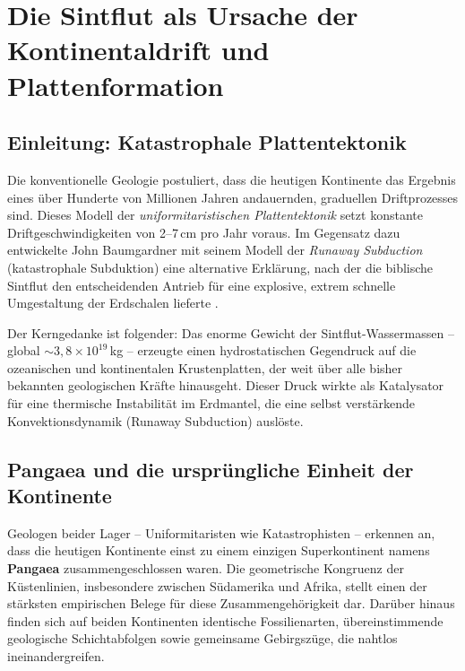 ﻿\documentclass[12pt,a4paper]{report}
\begin{document}
\chapter{Die Sintflut als Ursache der Kontinentaldrift und Plattenformation}
\label{sec:plattentektonik}

\section{Einleitung: Katastrophale Plattentektonik}

Die konventionelle Geologie postuliert, dass die heutigen Kontinente das Ergebnis eines über Hunderte von Millionen Jahren andauernden, graduellen Driftprozesses sind. Dieses Modell der \textit{uniformitaristischen Plattentektonik} setzt konstante Driftgeschwindigkeiten von 2--7\,cm pro Jahr voraus. Im Gegensatz dazu entwickelte John Baumgardner mit seinem Modell der \textit{Runaway Subduction} (katastrophale Subduktion) eine alternative Erklärung, nach der die biblische Sintflut den entscheidenden Antrieb für eine explosive, extrem schnelle Umgestaltung der Erdschalen lieferte \cite{baumgardner1994}.

Der Kerngedanke ist folgender: Das enorme Gewicht der Sintflut-Wassermassen -- global $\sim 3{,}8 \times 10^{19}$\,kg -- erzeugte einen hydrostatischen Gegendruck auf die ozeanischen und kontinentalen Krustenplatten, der weit über alle bisher bekannten geologischen Kräfte hinausgeht. Dieser Druck wirkte als Katalysator für eine thermische Instabilität im Erdmantel, die eine selbst verstärkende Konvektionsdynamik (Runaway Subduction) auslöste.

\section{Pangaea und die ursprüngliche Einheit der Kontinente}

Geologen beider Lager -- Uniformitaristen wie Katastrophisten -- erkennen an, dass die heutigen Kontinente einst zu einem einzigen Superkontinent namens \textbf{Pangaea} zusammengeschlossen waren. Die geometrische Kongruenz der Küstenlinien, insbesondere zwischen Südamerika und Afrika, stellt einen der stärksten empirischen Belege für diese Zusammengehörigkeit dar. Darüber hinaus finden sich auf beiden Kontinenten identische Fossilienarten, übereinstimmende geologische Schichtabfolgen sowie gemeinsame Gebirgszüge, die nahtlos ineinandergreifen.
\end{document}

